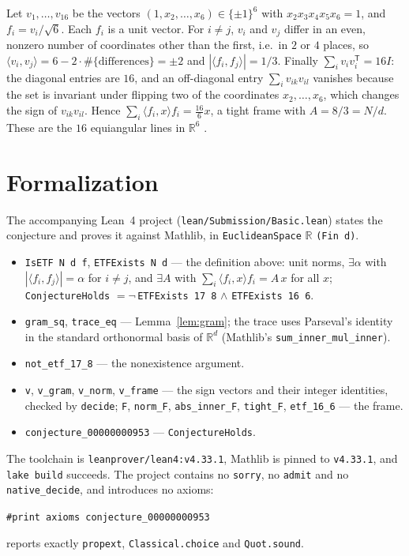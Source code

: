 \documentclass[11pt]{article}
\theoremstyle{plain}
\theoremstyle{definition}
\theoremstyle{remark}
\newcommand{\ip}[2]{\langle #1,#2\rangle}
\begin{document}
Let $v_1,\ldots,v_{16}$ be the vectors $(1,x_2,\ldots,x_6)\in\{\pm1\}^6$ with
$x_2x_3x_4x_5x_6=1$, and $f_i=v_i/\sqrt6$. Each $f_i$ is a unit vector. For
$i\ne j$, $v_i$ and $v_j$ differ in an even, nonzero number of coordinates
other than the first, i.e.\ in $2$ or $4$ places, so $\ip{v_i}{v_j}=6-2\cdot
\#\{\text{differences}\}=\pm2$ and $|\ip{f_i}{f_j}|=1/3$. Finally
$\sum_iv_iv_i^{\mathsf T}=16I$: the diagonal entries are $16$, and an
off-diagonal entry $\sum_iv_{ik}v_{il}$ vanishes because the set is invariant
under flipping two of the coordinates $x_2,\ldots,x_6$, which changes the sign of
$v_{ik}v_{il}$. Hence $\sum_i\ip{f_i}{x}f_i=\frac{16}6x$, a tight frame with
$A=8/3=N/d$. These are the $16$ equiangular lines in $\mathbb R^6$ \cite{ls}.

\section{Formalization}

The accompanying Lean~4 project (\texttt{lean/Submission/Basic.lean}) states
the conjecture and proves it against Mathlib, in
\texttt{EuclideanSpace} $\mathbb R$ \texttt{(Fin d)}.

\begin{itemize}
  \item \texttt{IsETF N d f}, \texttt{ETFExists N d} --- the definition above:
    unit norms, $\exists\alpha$ with $|\ip{f_i}{f_j}|=\alpha$ for $i\ne j$, and
    $\exists A$ with $\sum_i\ip{f_i}{x}f_i=A\,x$ for all $x$;
    \texttt{ConjectureHolds} $=\lnot$\,\texttt{ETFExists 17 8} $\wedge$
    \texttt{ETFExists 16 6}.
  \item \texttt{gram\_sq}, \texttt{trace\_eq} --- Lemma~\ref{lem:gram}; the
    trace uses Parseval's identity in the standard orthonormal basis of
    $\mathbb R^d$ (Mathlib's \texttt{sum\_inner\_mul\_inner}).
  \item \texttt{not\_etf\_17\_8} --- the nonexistence argument.
  \item \texttt{v}, \texttt{v\_gram}, \texttt{v\_norm}, \texttt{v\_frame} ---
    the sign vectors and their integer identities, checked by
    \texttt{decide}; \texttt{F}, \texttt{norm\_F}, \texttt{abs\_inner\_F},
    \texttt{tight\_F}, \texttt{etf\_16\_6} --- the frame.
  \item \texttt{conjecture\_00000000953} --- \texttt{ConjectureHolds}.
\end{itemize}

The toolchain is \texttt{leanprover/lean4:v4.33.1}, Mathlib is pinned to
\texttt{v4.33.1}, and \texttt{lake build} succeeds. The project contains no
\texttt{sorry}, no \texttt{admit} and no \texttt{native\_decide}, and
introduces no axioms:
\begin{center}
\texttt{\#print axioms conjecture\_00000000953}
\end{center}
reports exactly \texttt{propext}, \texttt{Classical.choice} and
\texttt{Quot.sound}.
\end{document}
